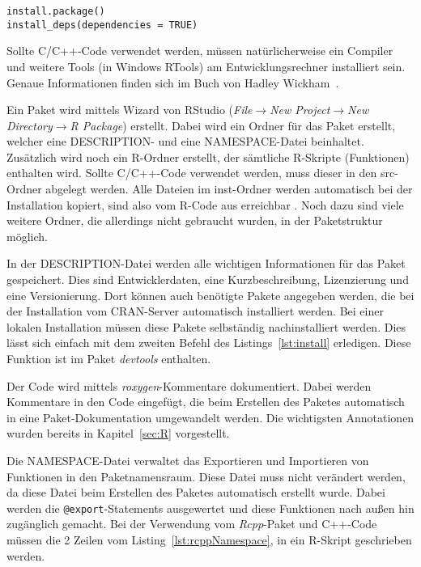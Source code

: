\begin{lstlisting}[caption=Installation eines Paketes und dessen Abhängigkeiten, label={lst:install}, float=!th]
install.package()
install_deps(dependencies = TRUE)
\end{lstlisting}

Sollte C/C++-Code verwendet werden, müssen natürlicherweise ein Compiler und weitere Tools (in Windows RTools) am Entwicklungsrechner installiert sein. Genaue Informationen finden sich im Buch von Hadley Wickham~\cite[S.~18~ff.]{wickham2015r}.

Ein Paket wird mittels Wizard von RStudio (\emph{File$\rightarrow$New Project$\rightarrow$New Directory$\rightarrow$R Package}) erstellt. Dabei wird ein Ordner für das Paket erstellt, welcher eine DESCRIPTION- und eine NAMESPACE-Datei beinhaltet. Zusätzlich wird noch ein R-Ordner erstellt, der sämtliche R-Skripte (Funktionen) enthalten wird. Sollte C/C++-Code verwendet werden, muss dieser in den src-Ordner abgelegt werden. Alle Dateien im inst-Ordner werden automatisch bei der Installation kopiert, sind also vom R-Code aus erreichbar \cite[S.~196~ff.]{wickham2015r}. Noch dazu sind viele weitere Ordner, die allerdings nicht gebraucht wurden, in der Paketstruktur möglich.~\cite[S.~28~ff.]{wickham2015r}

In der DESCRIPTION-Datei werden alle wichtigen Informationen für das Paket gespeichert. Dies sind Entwicklerdaten, eine Kurzbeschreibung, Lizenzierung und eine Versionierung. Dort können auch benötigte Pakete angegeben werden, die bei der Installation vom CRAN-Server automatisch installiert werden. Bei einer lokalen Installation müssen diese Pakete selbständig nachinstalliert werden. Dies lässt sich einfach mit dem zweiten Befehl des Listings~\ref{lst:install} erledigen. Diese Funktion ist im Paket \emph{devtools} enthalten.~\cite[67-82]{wickham2015r}

Der Code wird mittels \emph{roxygen}-Kommentare dokumentiert. Dabei werden Kommentare in den Code eingefügt, die beim Erstellen des Paketes automatisch in eine Paket-Dokumentation umgewandelt werden. Die wichtigsten Annotationen wurden bereits in Kapitel~\ref{sec:R} vorgestellt.~\cite[83-110]{wickham2015r}

Die NAMESPACE-Datei verwaltet das Exportieren und Importieren von Funktionen in den Paketnamensraum. Diese Datei muss nicht verändert werden, da diese Datei beim Erstellen des Paketes automatisch erstellt wurde. Dabei werden die \texttt{@export}-Statements ausgewertet und diese Funktionen nach außen hin zugänglich gemacht. Bei der Verwendung vom \emph{Rcpp}-Paket und C++-Code müssen die 2 Zeilen vom Listing~\ref{lst:rcppNamespace}, in ein R-Skript geschrieben werden.~\cite[144-160]{wickham2015r}

